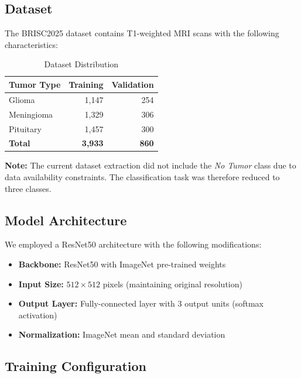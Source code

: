 \documentclass[11pt,a4paper]{article}
\begin{document}
\subsection{Dataset}

The BRISC2025 dataset contains T1-weighted MRI scans with the following characteristics:

\begin{table}[H]
\centering
\caption{Dataset Distribution}
\begin{tabular}{lrr}
\toprule
\textbf{Tumor Type} & \textbf{Training} & \textbf{Validation} \\
\midrule
Glioma & 1,147 & 254 \\
Meningioma & 1,329 & 306 \\
Pituitary & 1,457 & 300 \\
\midrule
\textbf{Total} & \textbf{3,933} & \textbf{860} \\
\bottomrule
\end{tabular}
\end{table}

\textbf{Note:} The current dataset extraction did not include the \textit{No Tumor} class due to data availability constraints. The classification task was therefore reduced to three classes.

\subsection{Model Architecture}

We employed a ResNet50 architecture with the following modifications:

\begin{itemize}
    \item \textbf{Backbone:} ResNet50 with ImageNet pre-trained weights
    \item \textbf{Input Size:} $512 \times 512$ pixels (maintaining original resolution)
    \item \textbf{Output Layer:} Fully-connected layer with 3 output units (softmax activation)
    \item \textbf{Normalization:} ImageNet mean and standard deviation
\end{itemize}

\subsection{Training Configuration}
\end{document}
